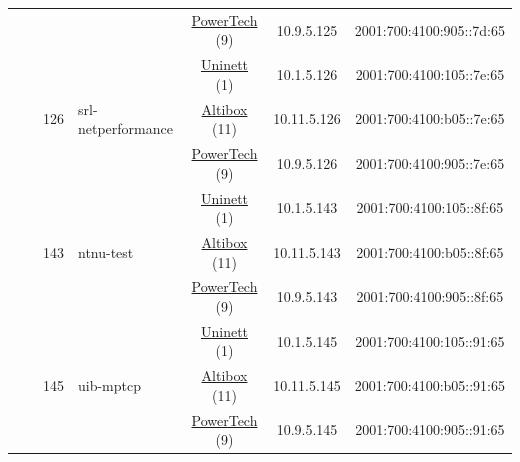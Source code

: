 \begin{small}
\begin{center}
\begin{longtable}{|c|c|c|c|c|c|c|c|}
  &  &  &  & \multicolumn{2}{|c|}{\tiny{\href{http://www.powertech.no}{PowerTech} (9)}} & \tiny{10.9.5.125} & \tiny{2001:700:4100:905::7d:65} \\* \cline{3-3}\cline{4-4}\cline{5-5}\cline{6-6}\cline{7-7}\cline{8-8}
  &  & \multirow{3}{*}{\tiny{126}} & \multicolumn{1}{|l|}{\multirow{3}{*}{\tiny{srl-netperformance}}} & \multicolumn{2}{|c|}{\tiny{\href{https://www.uninett.no}{Uninett} (1)}} & \tiny{10.1.5.126} & \tiny{2001:700:4100:105::7e:65} \\* \cline{5-5}\cline{6-6}\cline{7-7}\cline{8-8}
  &  &  &  & \multicolumn{2}{|c|}{\tiny{\href{https://www.altibox.no}{Altibox} (11)}} & \tiny{10.11.5.126} & \tiny{2001:700:4100:b05::7e:65} \\* \cline{5-5}\cline{6-6}\cline{7-7}\cline{8-8}
  &  &  &  & \multicolumn{2}{|c|}{\tiny{\href{http://www.powertech.no}{PowerTech} (9)}} & \tiny{10.9.5.126} & \tiny{2001:700:4100:905::7e:65} \\* \cline{3-3}\cline{4-4}\cline{5-5}\cline{6-6}\cline{7-7}\cline{8-8}
  &  & \multirow{3}{*}{\tiny{143}} & \multicolumn{1}{|l|}{\multirow{3}{*}{\tiny{ntnu-test}}} & \multicolumn{2}{|c|}{\tiny{\href{https://www.uninett.no}{Uninett} (1)}} & \tiny{10.1.5.143} & \tiny{2001:700:4100:105::8f:65} \\* \cline{5-5}\cline{6-6}\cline{7-7}\cline{8-8}
  &  &  &  & \multicolumn{2}{|c|}{\tiny{\href{https://www.altibox.no}{Altibox} (11)}} & \tiny{10.11.5.143} & \tiny{2001:700:4100:b05::8f:65} \\* \cline{5-5}\cline{6-6}\cline{7-7}\cline{8-8}
  &  &  &  & \multicolumn{2}{|c|}{\tiny{\href{http://www.powertech.no}{PowerTech} (9)}} & \tiny{10.9.5.143} & \tiny{2001:700:4100:905::8f:65} \\* \cline{3-3}\cline{4-4}\cline{5-5}\cline{6-6}\cline{7-7}\cline{8-8}
  &  & \multirow{3}{*}{\tiny{145}} & \multicolumn{1}{|l|}{\multirow{3}{*}{\tiny{uib-mptcp}}} & \multicolumn{2}{|c|}{\tiny{\href{https://www.uninett.no}{Uninett} (1)}} & \tiny{10.1.5.145} & \tiny{2001:700:4100:105::91:65} \\* \cline{5-5}\cline{6-6}\cline{7-7}\cline{8-8}
  &  &  &  & \multicolumn{2}{|c|}{\tiny{\href{https://www.altibox.no}{Altibox} (11)}} & \tiny{10.11.5.145} & \tiny{2001:700:4100:b05::91:65} \\* \cline{5-5}\cline{6-6}\cline{7-7}\cline{8-8}
  &  &  &  & \multicolumn{2}{|c|}{\tiny{\href{http://www.powertech.no}{PowerTech} (9)}} & \tiny{10.9.5.145} & \tiny{2001:700:4100:905::91:65} \\* \cline{3-3}\cline{4-4}\cline{5-5}\cline{6-6}\cline{7-7}\cline{8-8}

\end{longtable}
\end{center}
\end{small}
